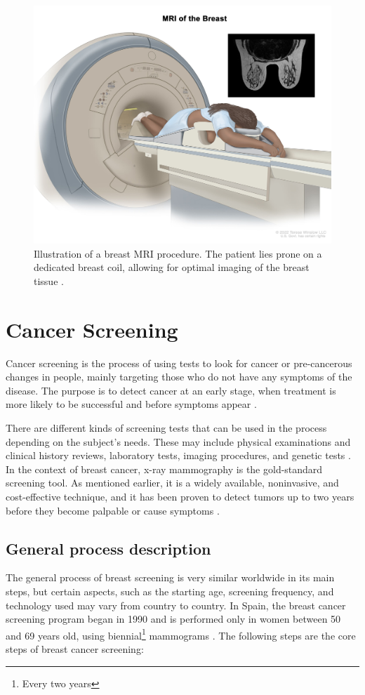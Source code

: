 \documentclass[a4paper,10pt]{book}
\begin{document}
\begin{figure}
    \centering
    \includegraphics[width=0.5\linewidth]{reports//assets/breast_mri.jpg}
    \caption[Breast MRI procedure]{Illustration of a breast MRI procedure. The patient lies prone on a dedicated breast coil, allowing for optimal imaging of the breast tissue \cite{nih_definition_2011}.}
    \label{fig:breast_mri}
\end{figure}


\section{Cancer Screening}

Cancer screening is the process of using tests to look for cancer or pre-cancerous changes in people, mainly targeting those who do not have any symptoms of the disease. The purpose is to detect cancer at an early stage, when treatment is more likely to be successful and before symptoms appear \cite{noauthor_cancer_2010}.

There are different kinds of screening tests that can be used in the process depending on the subject’s needs. These may include physical examinations and clinical history reviews, laboratory tests, imaging procedures, and genetic tests \cite{noauthor_cancer_2010}. In the context of breast cancer, x-ray mammography is the gold-standard screening tool. As mentioned earlier, it is a widely available, noninvasive, and cost-effective technique, and it has been proven to detect tumors up to two years before they become palpable or cause symptoms \cite{cancer_que_2023}.

\subsection{General process description}

The general process of breast screening is very similar worldwide in its main steps, but certain aspects, such as the starting age, screening frequency, and technology used may vary from country to country. In Spain, the breast cancer screening program began in 1990 and is performed only in women between 50 and 69 years old, using biennial\footnote{Every two years} mammograms \cite{noauthor_ministerio_nodate}. The following steps are the core steps of breast cancer screening:
\end{document}
